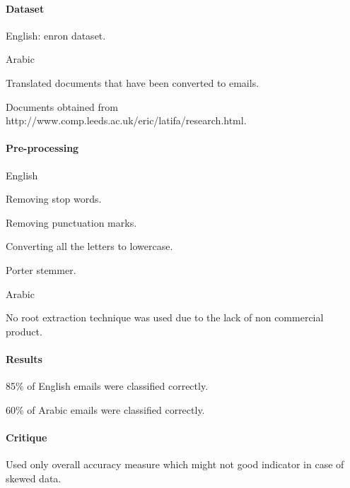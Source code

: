 \documentclass[12pt]{article}
\newenvironment{my_itemize}
{\begin{itemize}
  \setlength{\itemsep}{0cm}
  \setlength{\parskip}{0cm}}
{\end{itemize}}
\begin{document}
\paragraph{Dataset}
\begin{my_itemize}
    \item English: enron dataset.
    \item Arabic
    \begin{my_itemize}
        \item Translated documents that have been converted to emails.
        \item Documents obtained from http://www.comp.leeds.ac.uk/eric/latifa/research.html.
    \end{my_itemize}
\end{my_itemize}

\paragraph{Pre-processing}
\begin{my_itemize}
    \item English
    \begin{my_itemize}
        \item Removing stop words.
        \item Removing punctuation marks.
        \item Converting all the letters to lowercase.
        \item Porter stemmer.
    \end{my_itemize}
    \item Arabic
    \begin{my_itemize}
        \item No root extraction technique was used due to the lack of non commercial product.
    \end{my_itemize}
\end{my_itemize}

\paragraph{Results}
\begin{my_itemize}
    \item 85\% of English emails were classified correctly.
    \item 60\% of Arabic emails were classified correctly.
\end{my_itemize}

\paragraph{Critique}
\begin{my_itemize}
    \item Used only overall accuracy measure which might not good indicator in case of skewed data.
\end{my_itemize}
\end{document}
